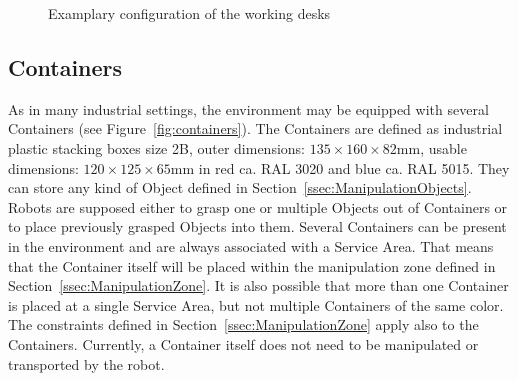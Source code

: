 \begin{figure}[h!]
	\begin{center}
		\hspace{.05\textwidth}
	\end{center}
	\caption{Examplary configuration of the working desks}
	\label{fig:ast_example}
\end{figure}







\subsection{Containers}
As in many industrial settings, the \RCAW environment may be equipped with several Containers (see Figure~\ref{fig:containers}). The Containers are defined as industrial plastic stacking boxes size 2B, outer dimensions: $135 \times 160 \times 82  \si{\milli\meter}$, usable dimensions: $120 \times 125 \times 65  \si{\milli\meter}$  in red ca. RAL 3020 and blue ca. RAL 5015.
They can store any kind of Object defined in Section~\ref{ssec:ManipulationObjects}. Robots are supposed either to grasp one or multiple Objects out of Containers or to place previously grasped Objects into them. Several Containers can be present in the environment and are always associated with a Service Area. That means that the Container itself will be placed within the manipulation zone defined in Section~\ref{ssec:ManipulationZone}.
It is also possible that more than one Container is placed at a single Service Area, but not multiple Containers of the same color.
The constraints defined in Section~\ref{ssec:ManipulationZone} apply also to the Containers.
Currently, a Container itself does not need to be manipulated or transported by the robot.

